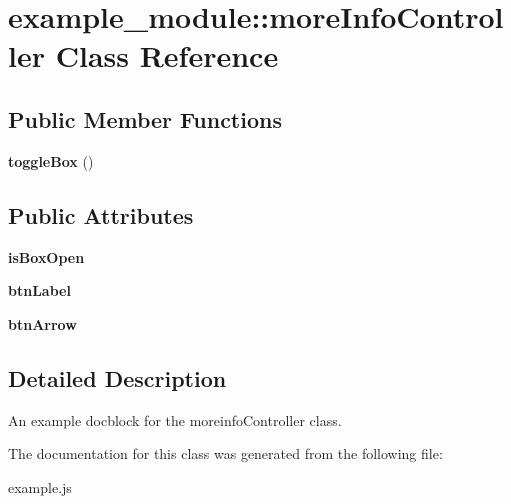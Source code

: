 \hypertarget{classexample__module_1_1moreInfoController}{\section{example\-\_\-module\-:\-:more\-Info\-Controller Class Reference}
\label{classexample__module_1_1moreInfoController}
}
\subsection*{Public Member Functions}
\begin{DoxyCompactItemize}
\item 
\hypertarget{classexample__module_1_1moreInfoController_a6b2c8d1270678fdc8b58508aadf7117e}{{\bfseries toggle\-Box} ()}\label{classexample__module_1_1moreInfoController_a6b2c8d1270678fdc8b58508aadf7117e}

\end{DoxyCompactItemize}
\subsection*{Public Attributes}
\begin{DoxyCompactItemize}
\item 
\hypertarget{classexample__module_1_1moreInfoController_a65beece2922304ac9fe23eb85e988dea}{{\bfseries is\-Box\-Open}}\label{classexample__module_1_1moreInfoController_a65beece2922304ac9fe23eb85e988dea}

\item 
\hypertarget{classexample__module_1_1moreInfoController_a5e0cf81009df128120a09597b7969aa5}{{\bfseries btn\-Label}}\label{classexample__module_1_1moreInfoController_a5e0cf81009df128120a09597b7969aa5}

\item 
\hypertarget{classexample__module_1_1moreInfoController_ae1ec5544cb18991af9ce78b1cd1529b3}{{\bfseries btn\-Arrow}}\label{classexample__module_1_1moreInfoController_ae1ec5544cb18991af9ce78b1cd1529b3}

\end{DoxyCompactItemize}


\subsection{Detailed Description}
An example docblock for the moreinfo\-Controller class. 

The documentation for this class was generated from the following file\-:\begin{DoxyCompactItemize}
\item 
example.\-js\end{DoxyCompactItemize}
